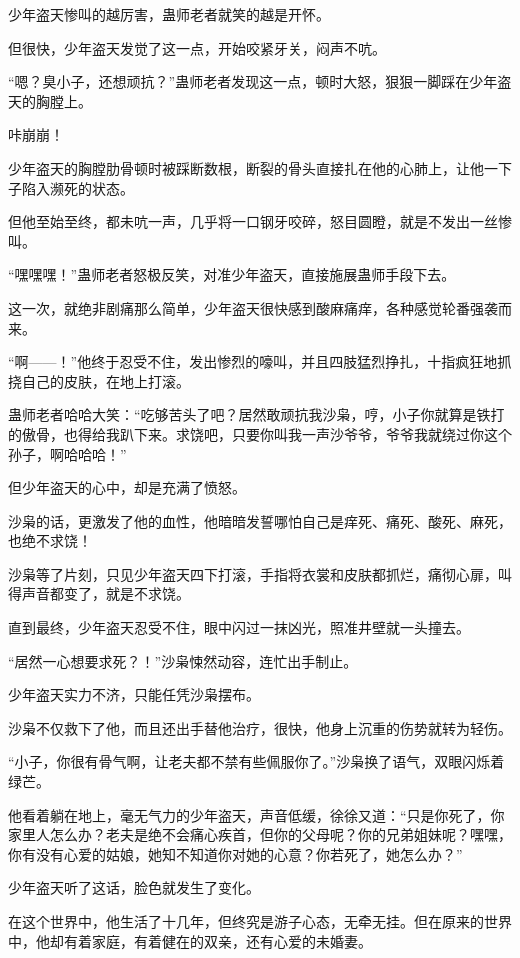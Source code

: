 
\begin{this_body}

少年盗天惨叫的越厉害，蛊师老者就笑的越是开怀。

但很快，少年盗天发觉了这一点，开始咬紧牙关，闷声不吭。

“嗯？臭小子，还想顽抗？”蛊师老者发现这一点，顿时大怒，狠狠一脚踩在少年盗天的胸膛上。

咔崩崩！

少年盗天的胸膛肋骨顿时被踩断数根，断裂的骨头直接扎在他的心肺上，让他一下子陷入濒死的状态。

但他至始至终，都未吭一声，几乎将一口钢牙咬碎，怒目圆瞪，就是不发出一丝惨叫。

“嘿嘿嘿！”蛊师老者怒极反笑，对准少年盗天，直接施展蛊师手段下去。

这一次，就绝非剧痛那么简单，少年盗天很快感到酸麻痛痒，各种感觉轮番强袭而来。

“啊——！”他终于忍受不住，发出惨烈的嚎叫，并且四肢猛烈挣扎，十指疯狂地抓挠自己的皮肤，在地上打滚。

蛊师老者哈哈大笑：“吃够苦头了吧？居然敢顽抗我沙枭，哼，小子你就算是铁打的傲骨，也得给我趴下来。求饶吧，只要你叫我一声沙爷爷，爷爷我就绕过你这个孙子，啊哈哈哈！”

但少年盗天的心中，却是充满了愤怒。

沙枭的话，更激发了他的血性，他暗暗发誓哪怕自己是痒死、痛死、酸死、麻死，也绝不求饶！

沙枭等了片刻，只见少年盗天四下打滚，手指将衣裳和皮肤都抓烂，痛彻心扉，叫得声音都变了，就是不求饶。

直到最终，少年盗天忍受不住，眼中闪过一抹凶光，照准井壁就一头撞去。

“居然一心想要求死？！”沙枭悚然动容，连忙出手制止。

少年盗天实力不济，只能任凭沙枭摆布。

沙枭不仅救下了他，而且还出手替他治疗，很快，他身上沉重的伤势就转为轻伤。

“小子，你很有骨气啊，让老夫都不禁有些佩服你了。”沙枭换了语气，双眼闪烁着绿芒。

他看着躺在地上，毫无气力的少年盗天，声音低缓，徐徐又道：“只是你死了，你家里人怎么办？老夫是绝不会痛心疾首，但你的父母呢？你的兄弟姐妹呢？嘿嘿，你有没有心爱的姑娘，她知不知道你对她的心意？你若死了，她怎么办？”

少年盗天听了这话，脸色就发生了变化。

在这个世界中，他生活了十几年，但终究是游子心态，无牵无挂。但在原来的世界中，他却有着家庭，有着健在的双亲，还有心爱的未婚妻。


\end{this_body}
